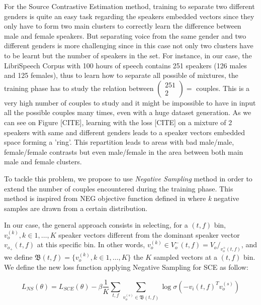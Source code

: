 \documentclass[master, tikz, final,11pt, dvipdfmx]{iscs-thesis}
\begin{document}
For the Source Contrastive Estimation method, training to separate two different genders is quite an easy task regarding the speakers embedded vectors since they only have to form two main clusters to correctly learn the difference between male and female speakers. But separating voice from the same gender and two different genders is more challenging since in this case not only two clusters have to be learnt but the number of speakers in the set. For instance, in our case, the LibriSpeech Corpus with 100 hours of speech contains 251 speakers (126 males and 125 females), thus to learn how to separate all possible of mixtures, the training phase has to study the relation between $\left(\! \begin{array}{c} 251 \\ 2 \end{array} \!\right) = $ couples. This is a very high number of couples to study and it might be impossible to have in input all the possible couples many times, even with a huge dataset generation. As we can see on Figure [CITE], learning with the loss [CITE] on a mixture of 2 speakers with same and different genders leads to a speaker vectors embedded space forming a 'ring'. This repartition leads to areas with bad male/male, female/female contrasts but even male/female in the area between both main male and female clusters. 

To tackle this problem, we propose to use \textit{Negative Sampling} method in order to extend the number of couples encountered during the training phase. This method is inspired from NEG objective function  defined in \cite{NS} where \textit{k} negative samples are drawn from a certain distribution. 

In our case, the general approach consists in selecting, for a $(t,f)$ bin, $v_o^{(k)}, k \in 1,\dotsc,K$ speaker vectors different from the dominant speaker vector $v_{o_{+}}(t,f)$ at this specific bin. In other words, $v_o^{(k)} \in V_o^-(t,f) = V_o/_{v_o^+(t,f)}$, and we define $\mathfrak{B}(t,f) = \{v_o^{(k)}, k \in 1,\dotsc,K\}$ the $K$ sampled vectors at a $(t,f)$ bin. We define the new loss function applying Negative Sampling for SCE as follow:


\[L_{NS}(\theta) = L_{SCE}(\theta) - \beta \frac{1}{K} \sum_{t,f} \sum_{v_o^{(s)} \in \mathfrak{B}(t,f)} \log \sigma(- v_i(t,f)^{T} v_o^{(s)}) \]
\end{document}
